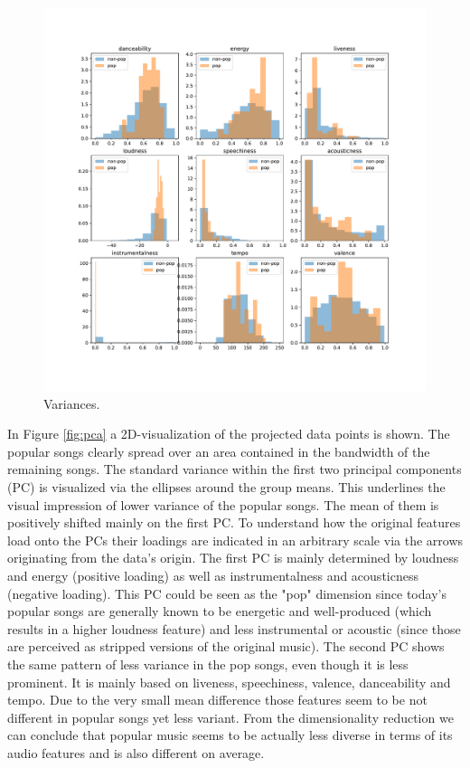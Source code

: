 \documentclass{article}
\begin{document}
\begin{figure}
  \centering
  \includegraphics[width=1\linewidth]{../fig/002_variances.pdf}
  \vspace*{-15mm}
  \caption{Variances.}
\end{figure}

In Figure \ref{fig:pca} a 2D-visualization of the projected data points is shown. The popular songs clearly spread over an area contained in the bandwidth of the remaining songs. The standard variance within the first two principal components (PC) is visualized via the ellipses around the group means. This underlines the visual impression of lower variance of the popular songs. The mean of them is positively shifted mainly on the first PC. To understand how the original features load onto the PCs their loadings are indicated in an arbitrary scale via the arrows originating from the data's origin. The first PC is mainly determined by loudness and energy (positive loading) as well as instrumentalness and acousticness (negative loading). This PC could be seen as the "pop" dimension since today's popular songs are generally known to be energetic and well-produced (which results in a higher loudness feature) and less instrumental or acoustic (since those are perceived as stripped versions of the original music). The second PC shows the same pattern of less variance in the pop songs, even though it is less prominent. It is mainly based on liveness, speechiness, valence, danceability and tempo. Due to the very small mean difference those features seem to be not different in popular songs yet less variant. From the dimensionality reduction we can conclude that popular music seems to be actually less diverse in terms of its audio features and is also different on average.
\end{document}

